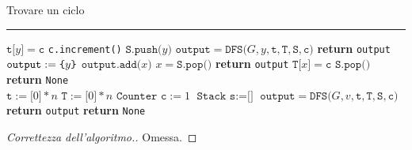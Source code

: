 \documentclass[a4paper, 12pt]{report}
\begin{document}
\begin{framedalgo}[label={findCycleDir}, breakable]{Trovare un ciclo}
        \hrule
        \begin{algorithmic}[1]
                        \State $\texttt{t[}y\texttt{]} = \texttt{c}$
                        \State \texttt{c.increment()}
                        \State $\texttt{S.push(}y\texttt{)}$
                        \State $\texttt{output} = \texttt{DFS(}G, y, \texttt{t}, \texttt{T}, \texttt{S}, \texttt{c)}$
                            \State \textbf{return} \texttt{output}
                        \EndIf
                        \State $\texttt{output} := \verb|{| y \verb|}|$ 
                            \State $\texttt{output.add(}x\texttt{)}$
                            \State $x = \texttt{S.pop()}$
                        \EndWhile
                        \State \textbf{return} \texttt{output}
                    \EndIf
                \EndFor
                \State $\texttt{T[}x\texttt{]} = \texttt{c}$
                \State $\texttt{S.pop()}$
                \State \textbf{return} \texttt{None}
            \EndFunction
            \\
                \State $\texttt{t} := \texttt{[}0\texttt{]} * n$
                \State $\texttt{T} := \texttt{[}0\texttt{]} * n$
                \State $\texttt{Counter c} := 1$
                \State $\texttt{Stack s} := \texttt{[]}$
                        \State $\texttt{output} = \texttt{DFS(}G, v, \texttt{t}, \texttt{T}, \texttt{S}, \texttt{c)}$
                            \State \textbf{return} \texttt{output}
                        \EndIf
                    \EndIf
                \EndFor
                \State \textbf{return} \texttt{None}
            \EndFunction
        \end{algorithmic}
    \end{framedalgo}

    \begin{proof}[Correttezza dell'algoritmo.]
        Omessa.
    \end{proof}
\end{document}
